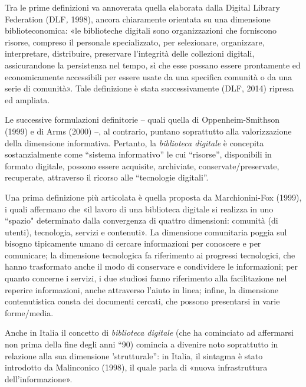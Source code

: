 \documentclass[
  b5paper,
  twoside,
  12pt,
  chapterprefix=false,
  bibliography=totocnumbered,
  parskip=false]{scrbook}
\begin{document}
Tra le prime definizioni va annoverata quella elaborata dalla Digital
Library Federation (DLF\emph{,} 1998), ancora chiaramente orientata su una
dimensione biblioteconomica: «le biblioteche digitali sono
organizzazioni che forniscono risorse, compreso il personale
specializzato, per selezionare, organizzare, interpretare, distribuire,
preservare l'integrità delle collezioni digitali, assicurandone la
persistenza nel tempo, sì che esse possano essere prontamente ed
economicamente accessibili per essere usate da una specifica comunità o
da una serie di comunità». Tale definizione è stata successivamente
(DLF, 2014) ripresa ed ampliata.

Le successive formulazioni definitorie -- quali quella di
Oppenheim-Smithson (1999) e di Arms (2000) --, al contrario, puntano
soprattutto alla valorizzazione della dimensione informativa. Pertanto,
la \emph{biblioteca digitale} è concepita sostanzialmente come \enquote{sistema
informativo} le cui \enquote{risorse}, disponibili in formato digitale, possono
essere acquisite, archiviate, conservate/preservate, recuperate,
attraverso il ricorso alle \enquote{tecnologie digitali}.

Una prima definizione più articolata è quella proposta da
Marchionini-Fox (1999), i quali affermano che «il lavoro di una
biblioteca digitale si realizza in uno ``spazio" determinato dalla
convergenza di quattro dimensioni: comunità (di utenti), tecnologia,
servizi e contenuti». La dimensione comunitaria poggia sul bisogno
tipicamente umano di cercare informazioni per conoscere e per
comunicare; la dimensione tecnologica fa riferimento ai progressi
tecnologici, che hanno trasformato anche il modo di conservare e
condividere le informazioni; per quanto concerne i servizi, i due
studiosi fanno riferimento alla facilitazione nel reperire informazioni,
anche attraverso l'aiuto in linea; infine, la dimensione contenutistica
consta dei documenti cercati, che possono presentarsi in varie
forme/media.

Anche in Italia il concetto di \emph{biblioteca digitale} (che ha cominciato
ad affermarsi non prima della fine degli anni \enquote{90) comincia a divenire
noto soprattutto in relazione alla sua dimensione 'strutturale}: in
Italia, il sintagma è stato introdotto da Malinconico (1998), il quale
parla di «nuova infrastruttura dell'informazione».
\end{document}
